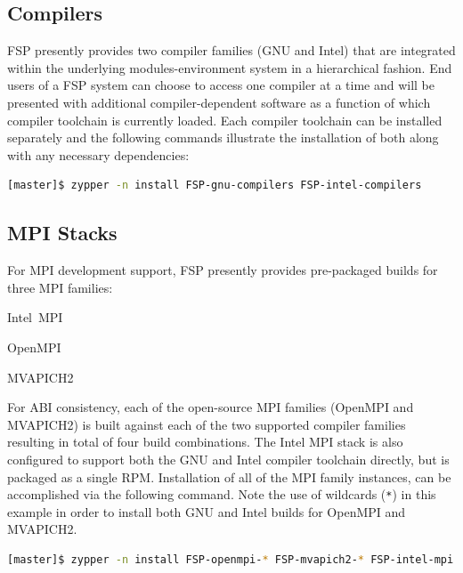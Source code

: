 \documentclass[letterpaper]{article}
\begin{document}
\subsection{Compilers}

FSP presently provides two compiler families ({GNU} and {Intel}) that are
integrated within the underlying modules-environment system in a hierarchical
fashion. End users of a FSP system can choose to access one compiler at a time
and will be presented with additional compiler-dependent software as a function
of which compiler toolchain is currently loaded. Each compiler toolchain can be
installed separately and the following commands illustrate the installation of
both along with any necessary dependencies:

\begin{lstlisting}[language=bash]
[master]$ zypper -n install FSP-gnu-compilers FSP-intel-compilers
\end{lstlisting}

\subsection{MPI Stacks} \label{sec:mpi}

For MPI development support, FSP presently provides pre-packaged builds for
three MPI families: 

\begin{itemize*}
\item Intel~MPI
\item OpenMPI
\item MVAPICH2
\end{itemize*}
 For ABI consistency, each of the open-source MPI families (OpenMPI and
 MVAPICH2) is built against each of the two supported compiler families
 resulting in total of four build combinations.  The Intel MPI stack is also
 configured to support both the GNU and Intel compiler toolchain directly, but
 is packaged as a single RPM. Installation of all of the MPI family instances,
 can be accomplished via the following command. Note the use of wildcards
 (\texttt{*}) in this example in order to install both GNU and Intel builds for
 OpenMPI and MVAPICH2.

\begin{lstlisting}[language=bash]
[master]$ zypper -n install FSP-openmpi-* FSP-mvapich2-* FSP-intel-mpi
\end{lstlisting}
\end{document}

